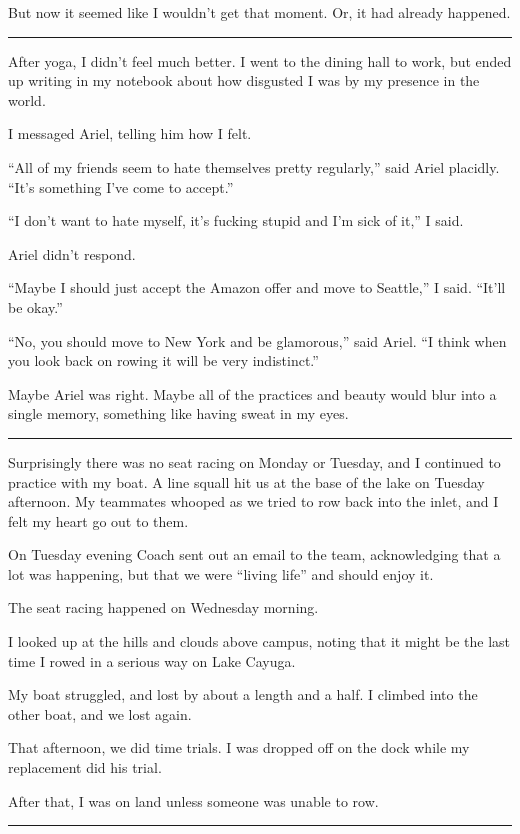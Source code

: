 But now it seemed like I wouldn't get that moment.  Or, it had already happened.

\plainfancybreak{12pt}{2}{}

After yoga, I didn't feel much better.  I went to the dining hall to work, but
ended up writing in my notebook about how disgusted I was by my presence in the
world.

I messaged Ariel, telling him how I felt.

``All of my friends seem to hate themselves pretty regularly,'' said Ariel
placidly.  ``It's something I've come to accept.''

``I don't want to hate myself, it's fucking stupid and I'm sick of it,'' I said.

Ariel didn't respond.

``Maybe I should just accept the Amazon offer and move to Seattle,'' I said.
``It'll be okay.''

``No, you should move to New York and be glamorous,'' said Ariel.  ``I think
when you look back on rowing it will be very indistinct.''

Maybe Ariel was right.  Maybe all of the practices and beauty would blur into a
single memory, something like having sweat in my eyes.

\plainfancybreak{12pt}{2}{}

Surprisingly there was no seat racing on Monday or Tuesday, and I continued to
practice with my boat.  A line squall hit us at the base of the lake on Tuesday
afternoon.  My teammates whooped as we tried to row back into the inlet, and I
felt my heart go out to them.

On Tuesday evening Coach sent out an email to the team, acknowledging that a lot
was happening, but that we were ``living life'' and should enjoy it.

The seat racing happened on Wednesday morning.

I looked up at the hills and clouds above campus, noting that it might be the
last time I rowed in a serious way on Lake Cayuga.

My boat struggled, and lost by about a length and a half.  I climbed into the
other boat, and we lost again.

That afternoon, we did time trials.  I was dropped off on the dock while my
replacement did his trial.

After that, I was on land unless someone was unable to row.

\plainfancybreak{12pt}{2}{}

